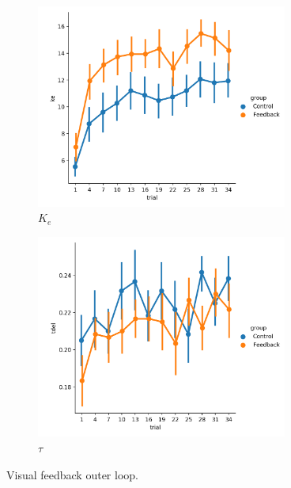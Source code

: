 \begin{figure}[t]
    \centering
    \begin{subfigure}[h]{0.49\textwidth}
        \centering
        \includegraphics[width=3.25in]{figures/ke.png}
        \caption{$K_e$}
        \label{fig:sm_ke}
    \end{subfigure}
    \hfill
    \begin{subfigure}[h]{0.49\textwidth}
        \centering
        \includegraphics[width=3.25in]{figures/tdel.png}
        \caption{$\tau$}
        \label{fig:sm_tdel}
    \end{subfigure}
    \caption{Visual feedback outer loop.}
\end{figure}

